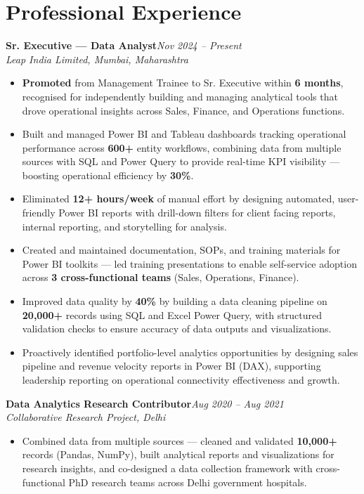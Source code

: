 \documentclass[10pt, letterpaper]{article}
\newcommand{\role}[3]{%
  \vspace{2pt}%
  {\bfseries #1}\hfill{\small\color{muted}\textit{#3}}\\[-2pt]%
  {\small\color{muted}\textit{#2}}%
}
\begin{document}
\section{Professional Experience}

\role{Sr. Executive — Data Analyst}{Leap India Limited, Mumbai, Maharashtra}{Nov 2024 – Present}

\begin{itemize}
  \item \textbf{Promoted} from Management Trainee to Sr. Executive within \textbf{6 months}, recognised for independently building and managing analytical tools that drove operational insights across Sales, Finance, and Operations functions.
  \item Built and managed Power BI and Tableau dashboards tracking operational performance across \textbf{600+} entity workflows, combining data from multiple sources with SQL and Power Query to provide real-time KPI visibility — boosting operational efficiency by \textbf{30\%}.
  \item Eliminated \textbf{12+ hours/week} of manual effort by designing automated, user-friendly Power BI reports with drill-down filters for client facing reports, internal reporting, and storytelling for analysis.
  \item Created and maintained documentation, SOPs, and training materials for Power BI toolkits — led training presentations to enable self-service adoption across \textbf{3 cross-functional teams} (Sales, Operations, Finance).
  \item Improved data quality by \textbf{40\%} by building a data cleaning pipeline on \textbf{20,000+} records using SQL and Excel Power Query, with structured validation checks to ensure accuracy of data outputs and visualizations.
  \item Proactively identified portfolio-level analytics opportunities by designing sales pipeline and revenue velocity reports in Power BI (DAX), supporting leadership reporting on operational connectivity effectiveness and growth.
\end{itemize}

\vspace{1pt}

\role{Data Analytics Research Contributor}{Collaborative Research Project, Delhi}{Aug 2020 – Aug 2021}

\begin{itemize}
  \item Combined data from multiple sources — cleaned and validated \textbf{10,000+} records (Pandas, NumPy), built analytical reports and visualizations for research insights, and co-designed a data collection framework with cross-functional PhD research teams across Delhi government hospitals.
\end{itemize}
\end{document}
